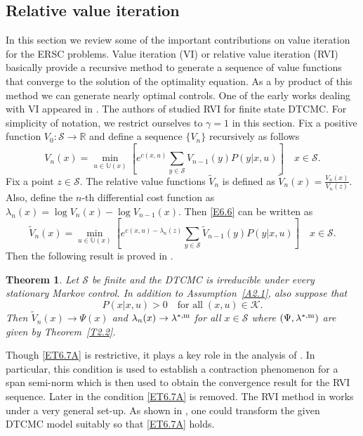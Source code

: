 \documentclass[notitlepage,11pt,reqno]{amsart}
\numberwithin{equation}{section}
\theoremstyle{plain}
\newtheorem{theorem}{Theorem}[section]
\theoremstyle{definition}
\theoremstyle{remark}
\newcommand{\Act}{{\mathds{U}}}
\newcommand{\sK}{{\mathscr{K}}}
\newcommand{\cS}{{\mathcal{S}}}     %
\newcommand{\lamstrdm}{\lambda^{*,{\rm m}}}
\newcommand{\RR}{\mathds{R}} %
\begin{document}
\subsection{Relative value iteration}
In this section we review some of the important contributions on value iteration for the ERSC problems. Value iteration (VI) or relative value iteration (RVI) basically provide a
recursive method to generate a sequence of value functions that converge to the solution of the optimality equation. As a by product of this method we can generate
nearly optimal controls. One of the early works dealing with VI appeared in \cite{BHP99}. The authors of \cite{BHP99} 
studied RVI for finite state DTCMC. For simplicity of notation, we restrict ourselves to $\gamma=1$ in this section. Fix a positive function $V_0:\cS\to \RR$ and define a sequence
$\{V_n\}$ recursively  as follows
\begin{equation}\label{E6.6}
V_n(x)=\min_{u\in\Act(x)}\left[ e^{c(x, u)}\sum_{y\in\cS} V_{n-1}(y) P(y|x, u)\right]\quad x\in\cS.
\end{equation}
Fix a point $z\in\cS$.
The relative value functions $\tilde{V}_n$ is defined as $\tilde{V}_n(x)= \frac{V_n(x)}{V_n(z)}$. Also, define the
$n$-th differential cost function as $\lambda_n(x)=\log V_{n}(x)-\log V_{n-1}(x)$.
Then \eqref{E6.6} can be written as 
\begin{equation}\label{E6.7}
\tilde{V}_n(x)=\min_{u\in\Act(x)}\left[ e^{c(x, u)-\lambda_n(z)}\sum_{y\in\cS} \tilde{V}_{n-1}(y) P(y|x, u)\right]\quad x\in\cS.
\end{equation}
Then the following result is proved in \cite{BHP99}.
\begin{theorem}\label{T6.7}
Let $\cS$ be finite and the DTCMC is irreducible under every stationary Markov control. In addition to Assumption~\ref{A2.1}, also suppose that
\begin{equation}\label{ET6.7A}
P(x|x, u)>0\quad \text{for all}\; (x, u)\in\sK.
\end{equation}
Then $\tilde{V}_n(x)\to\Psi(x)$ and $\lambda_n(x)\to\lamstrdm$ for all $x\in\cS$ where $(\Psi, \lamstrdm)$ are given by Theorem~\ref{T2.2}.
\end{theorem}
Though \eqref{ET6.7A} is restrictive, it plays a key role in the analysis of \cite{BHP99}. In particular, this condition is used to establish a contraction
phenomenon for a span semi-norm which is then used to obtain the convergence result for the RVI sequence. Later in \cite{MR2015911} the condition \eqref{ET6.7A} is removed.
The RVI method in \cite{MR2015911} works under a very general set-up. As shown in \cite{MR2015911}, one could transform the given DTCMC model suitably so that \eqref{ET6.7A} holds.
\end{document}
